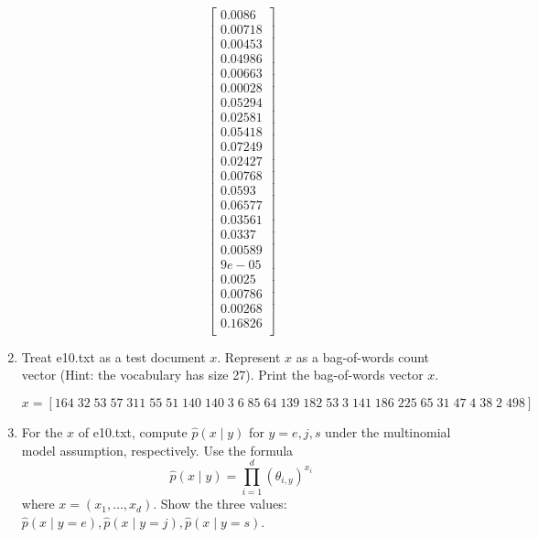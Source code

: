 \documentclass[a4paper]{article}
\theoremstyle{definition}
\newenvironment{soln}{
    \leavevmode\color{blue}\ignorespaces
}{}
\begin{document}
\begin{enumerate}
\begin{soln}
\[\begin{bmatrix}
                        0.0086 \\
                        0.00718 \\
                        0.00453 \\
                        0.04986 \\
                        0.00663 \\
                        0.00028 \\
                        0.05294 \\
                        0.02581 \\
                        0.05418 \\
                        0.07249 \\
                        0.02427 \\
                        0.00768 \\
                        0.0593 \\
                        0.06577 \\
                        0.03561 \\
                        0.0337 \\
                        0.00589 \\
                        9e-05 \\
                        0.0025 \\
                        0.00786 \\
                        0.00268 \\
                        0.16826 \\
        \end{bmatrix}
        \]
   
\end{soln}

\item
Treat e10.txt as a test document $x$.
Represent $x$ as a bag-of-words count vector (Hint: the vocabulary has size 27).
Print the bag-of-words vector $x$.

    \begin{soln}
        $x = [164\;32\;53\;57\;311\;55\;51\;140\;140\;3\;6\;85\;64\;139\;182\;53\;3\;141\;186\;225\;65\;31\;47\;4\;38\;2\;498]$
\end{soln}


\item
For the $x$ of e10.txt, compute $\hat p(x \mid y)$ for $y=e, j, s$ under the multinomial model assumption, respectively.
Use the formula
$$\hat p(x \mid y) = \prod_{i=1}^d (\theta_{i, y})^{x_i}$$
where $x=(x_1, \ldots, x_d)$.
Show the three values: $\hat p(x \mid y=e), \hat p(x \mid y=j), \hat p(x \mid y=s)$.


\end{enumerate}
\end{document}
